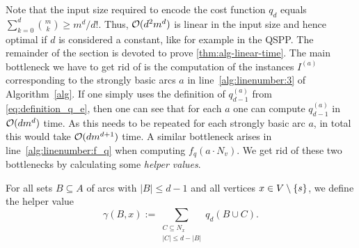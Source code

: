Note that  the input size required to encode the cost function $q_d$ equals $\sum_{k=0}^d \binom{m}{k} \geq m^d / d!$. Thus, $\mathcal{O}(d^2m^d)$ is linear in the input size and hence  optimal if  $d$ is considered a constant, like for example in the QSPP.
The remainder of the section is devoted to prove \cref{thm:alg-linear-time}. The main bottleneck we have to get rid of is the computation of the instances $I^{(a)}$ corresponding to the strongly basic arcs $a$ in line~\ref{alg:linenumber:3} of Algorithm~\ref{alg}. If one simply uses the definition of $q^{(a)}_{d-1}$ from \cref{eq:definition_q_e}, then one can see that for each $a$ one can compute $q^{(a)}_{d-1}$ in $\mathcal{O}(dm^d)$ time. As this needs to be repeated for each strongly basic arc $a$, in total this would take $\mathcal{O}(dm^{d+1})$ time. A similar bottleneck arises in line~\ref{alg:linenumber:f_q} when computing $f_q(a \cdot N_v)$. We get rid of these two bottlenecks by calculating some \emph{helper values}.

For all sets $B \subseteq A$ of arcs with $|B| \leq d-1$ and all vertices $x \in V \setminus \{ s \}$, we define the helper value
\begin{equation}
    \gamma(B, x) := \sum_{\substack{C \subseteq N_x\\ |C| \leq d - |B|}}q_d(B \cup C). \label{eq:helper-values}
\end{equation}


